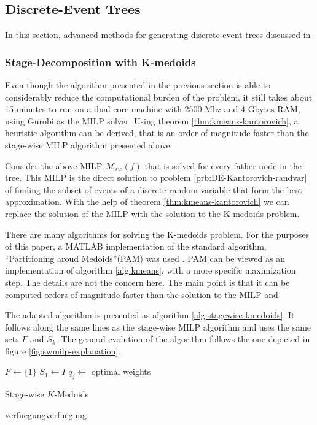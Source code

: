\subsection{Discrete-Event Trees}
In this section, advanced methods for generating discrete-event trees discussed in
\subsubsection{Stage-Decomposition with K-medoids}
Even though the algorithm presented in the previous section is able to considerably reduce the computational burden of the problem, it still takes about 15 minutes to run on a dual core machine with 2500 Mhz and 4 Gbytes RAM, using Gurobi as the MILP solver.
Using theorem \ref{thm:kmeans-kantorovich}, a heuristic algorithm can be derived, that is an order of magnitude faster than the stage-wise MILP algorithm presented above.

Consider the above MILP $\mathcal{M}_{sw}(f)$ that is solved for every father node in the tree.
This MILP is the direct solution to problem \ref{prb:DE-Kantorovich-randvar} of finding the subset of events of a discrete random variable that form the best approximation.
With the help of theorem \ref{thm:kmeans-kantorovich} we can replace the solution of the MILP with the solution to the K-medoids problem.

There are many algorithms for solving the K-medoids problem.
For the purposes of this paper, a MATLAB implementation of the standard algorithm, ``Partitioning aroud Medoids''(PAM) was used \cite{Kaufman1987}.
PAM can be viewed as an implementation of algorithm \ref{alg:kmeans}, with a more specific maximization step. The details are not the concern here. The main point is that it can be computed orders of magnitude faster than the solution to the MILP and 

The adapted algorithm is presented as algorithm \ref{alg:stagewise-kmedoids}.
It follows along the same lines as the stage-wise MILP algorithm and uses the same sets $F$ and $S_k$.
The general evolution of the algorithm follows the one depicted in figure \ref{fig:swmilp-explanation}.
\begin{algorithm}
  $F \leftarrow \{1\}$
  $S_1 \leftarrow I$
  $q_j\leftarrow $ optimal weights 
  \caption{Stage-wise $K$-Medoids}
  \label{alg:stagewise-kmedoids}
verfuegungverfuegung\end{algorithm}
